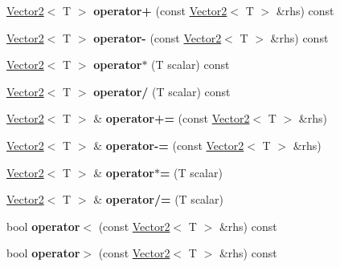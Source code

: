 \begin{DoxyCompactItemize}
\mbox{\hyperlink{class_vector2}{Vector2}}$<$ T $>$ {\bfseries operator+} (const \mbox{\hyperlink{class_vector2}{Vector2}}$<$ T $>$ \&rhs) const
\item 
\mbox{\label{class_vector2_ab79812a53ba6238fdcaef73cb22fcbb3}} 
\mbox{\hyperlink{class_vector2}{Vector2}}$<$ T $>$ {\bfseries operator-\/} (const \mbox{\hyperlink{class_vector2}{Vector2}}$<$ T $>$ \&rhs) const
\item 
\mbox{\label{class_vector2_a6b89b2f334240f06480bc55fce6c2a5a}} 
\mbox{\hyperlink{class_vector2}{Vector2}}$<$ T $>$ {\bfseries operator$\ast$} (T scalar) const
\item 
\mbox{\label{class_vector2_aae901abf0c2c7f0c772d8cb69213f628}} 
\mbox{\hyperlink{class_vector2}{Vector2}}$<$ T $>$ {\bfseries operator/} (T scalar) const
\item 
\mbox{\label{class_vector2_a198ab8bb7f0e0be8905869ccc5b2bf0e}} 
\mbox{\hyperlink{class_vector2}{Vector2}}$<$ T $>$ \& {\bfseries operator+=} (const \mbox{\hyperlink{class_vector2}{Vector2}}$<$ T $>$ \&rhs)
\item 
\mbox{\label{class_vector2_a1722e051fa3c354749c2c4c5c14b9c8e}} 
\mbox{\hyperlink{class_vector2}{Vector2}}$<$ T $>$ \& {\bfseries operator-\/=} (const \mbox{\hyperlink{class_vector2}{Vector2}}$<$ T $>$ \&rhs)
\item 
\mbox{\label{class_vector2_ac310f14122b41cbbbb3d4eac98c81f00}} 
\mbox{\hyperlink{class_vector2}{Vector2}}$<$ T $>$ \& {\bfseries operator$\ast$=} (T scalar)
\item 
\mbox{\label{class_vector2_a9e79272d8b7b39e8d8eafa6f4cbad04e}} 
\mbox{\hyperlink{class_vector2}{Vector2}}$<$ T $>$ \& {\bfseries operator/=} (T scalar)
\item 
\mbox{\label{class_vector2_abeb4df28fbd42c319b3e5529a1805e90}} 
bool {\bfseries operator$<$} (const \mbox{\hyperlink{class_vector2}{Vector2}}$<$ T $>$ \&rhs) const
\item 
\mbox{\label{class_vector2_ac550f020f264f8a8058ad3c623c60d40}} 
bool {\bfseries operator$>$} (const \mbox{\hyperlink{class_vector2}{Vector2}}$<$ T $>$ \&rhs) const

\end{DoxyCompactItemize}
